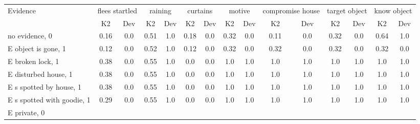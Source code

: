 \begin{table}\begin{tabular}{l|cc|cc|cc|cc|cc|cc|cc}\toprule\multirow{2}{*}{Evidence} & \multicolumn{2}{c}{flees startled}& \multicolumn{2}{c}{raining}& \multicolumn{2}{c}{curtains}& \multicolumn{2}{c}{motive}& \multicolumn{2}{c}{compromise house}& \multicolumn{2}{c}{target object}& \multicolumn{2}{c}{know object}\\& {K2} & {Dev}& {K2} & {Dev}& {K2} & {Dev}& {K2} & {Dev}& {K2} & {Dev}& {K2} & {Dev}& {K2} & {Dev}\\\midrule
no evidence, 0 & \cellcolor{Bittersweet}0.16&\cellcolor{Bittersweet}0.0&0.51&1.0&\cellcolor{Bittersweet}0.18&\cellcolor{Bittersweet}0.0&\cellcolor{Bittersweet}0.32&\cellcolor{Bittersweet}0.0&\cellcolor{Bittersweet}0.11&\cellcolor{Bittersweet}0.0&\cellcolor{Bittersweet}0.32&\cellcolor{Bittersweet}0.0&\cellcolor{Bittersweet}0.64&\cellcolor{Bittersweet}1.0\\E object is gone, 1 & \cellcolor{Bittersweet}0.12&\cellcolor{Bittersweet}0.0&0.52&1.0&\cellcolor{Bittersweet}0.12&\cellcolor{Bittersweet}0.0&\cellcolor{Bittersweet}0.32&\cellcolor{Bittersweet}0.0&\cellcolor{Bittersweet}0.32&\cellcolor{Bittersweet}0.0&\cellcolor{Bittersweet}0.32&\cellcolor{Bittersweet}0.0&\cellcolor{Bittersweet}0.32&\cellcolor{Bittersweet}0.0\\E broken lock, 1 & \cellcolor{Bittersweet}0.38&\cellcolor{Bittersweet}0.0&0.55&1.0&\cellcolor{Bittersweet}0.0&\cellcolor{Bittersweet}0.0&\cellcolor{Bittersweet}1.0&\cellcolor{Bittersweet}1.0&\cellcolor{Bittersweet}1.0&\cellcolor{Bittersweet}1.0&\cellcolor{Bittersweet}1.0&\cellcolor{Bittersweet}1.0&\cellcolor{Bittersweet}1.0&\cellcolor{Bittersweet}1.0\\E disturbed house, 1 & \cellcolor{Bittersweet}0.38&\cellcolor{Bittersweet}0.0&0.55&1.0&\cellcolor{Bittersweet}0.0&\cellcolor{Bittersweet}0.0&\cellcolor{Bittersweet}1.0&\cellcolor{Bittersweet}1.0&\cellcolor{Bittersweet}1.0&\cellcolor{Bittersweet}1.0&\cellcolor{Bittersweet}1.0&\cellcolor{Bittersweet}1.0&\cellcolor{Bittersweet}1.0&\cellcolor{Bittersweet}1.0\\E s spotted by house, 1 & \cellcolor{Bittersweet}0.38&\cellcolor{Bittersweet}0.0&0.55&1.0&\cellcolor{Bittersweet}0.0&\cellcolor{Bittersweet}0.0&\cellcolor{Bittersweet}1.0&\cellcolor{Bittersweet}1.0&\cellcolor{Bittersweet}1.0&\cellcolor{Bittersweet}1.0&\cellcolor{Bittersweet}1.0&\cellcolor{Bittersweet}1.0&\cellcolor{Bittersweet}1.0&\cellcolor{Bittersweet}1.0\\E s spotted with goodie, 1 & \cellcolor{Bittersweet}0.29&\cellcolor{Bittersweet}0.0&0.55&1.0&\cellcolor{Bittersweet}0.0&\cellcolor{Bittersweet}0.0&\cellcolor{Bittersweet}1.0&\cellcolor{Bittersweet}1.0&\cellcolor{Bittersweet}1.0&\cellcolor{Bittersweet}1.0&\cellcolor{Bittersweet}1.0&\cellcolor{Bittersweet}1.0&\cellcolor{Bittersweet}1.0&\cellcolor{Bittersweet}1.0\\E private, 0 & 
\end{tabular}
\end{table}

